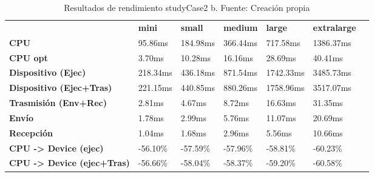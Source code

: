 \begin{table}[H]
    \centering
    \begin{tabular}{lllllll}
    \rowcolor[HTML]{DAE8FC} \ &  \textbf{mini} &  \textbf{small} &  \textbf{medium} &  \textbf{	large} &  \textbf{	extralarge} \\
    \cellcolor[HTML]{DAE8FC} \textbf{CPU} & 95.86ms & 184.98ms & 366.44ms & 	717.58ms & 	1386.37ms \\
    \rowcolor[HTML]{EFEFEF} \cellcolor[HTML]{DAE8FC} \textbf{CPU opt} & 3.70ms & 10.28ms & 16.16ms & 	28.69ms & 	40.41ms \\
    \cellcolor[HTML]{DAE8FC} \textbf{Dispositivo (Ejec)} & 218.34ms & 436.18ms & 871.54ms & 	1742.33ms & 	3485.73ms \\
    \rowcolor[HTML]{EFEFEF} \cellcolor[HTML]{DAE8FC} \textbf{Dispositivo (Ejec+Tras)} & 221.15ms & 440.85ms & 880.26ms & 	1758.96ms & 	3517.07ms \\
    \cellcolor[HTML]{DAE8FC} \textbf{Trasmisión (Env+Rec)} & 2.81ms & 4.67ms & 8.72ms & 	16.63ms & 	31.35ms \\
    \rowcolor[HTML]{EFEFEF} \cellcolor[HTML]{DAE8FC} \textbf{Envío} & 1.78ms & 2.99ms & 5.76ms & 	11.07ms & 	20.69ms \\
    \cellcolor[HTML]{DAE8FC} \textbf{Recepción} & 1.04ms & 1.68ms & 2.96ms & 	5.56ms & 	10.66ms \\
    \rowcolor[HTML]{EFEFEF} \cellcolor[HTML]{DAE8FC} \textbf{CPU -> Device (ejec)} & -56.10\% & -57.59\% & -57.96\% & 	-58.81\% & 	-60.23\% \\
    \cellcolor[HTML]{DAE8FC} \textbf{CPU -> Device (ejec+Tras)} & -56.66\% & -58.04\% & -58.37\% & 	-59.20\% & 	-60.58\% \\
    \end{tabular}
    \caption[Resultados de rendimiento studyCase2 b]{{Resultados de rendimiento studyCase2 b. Fuente: Creación propia}}
    \label{table_test_studyCase2_b_hw_performanceResults}
\end{table}